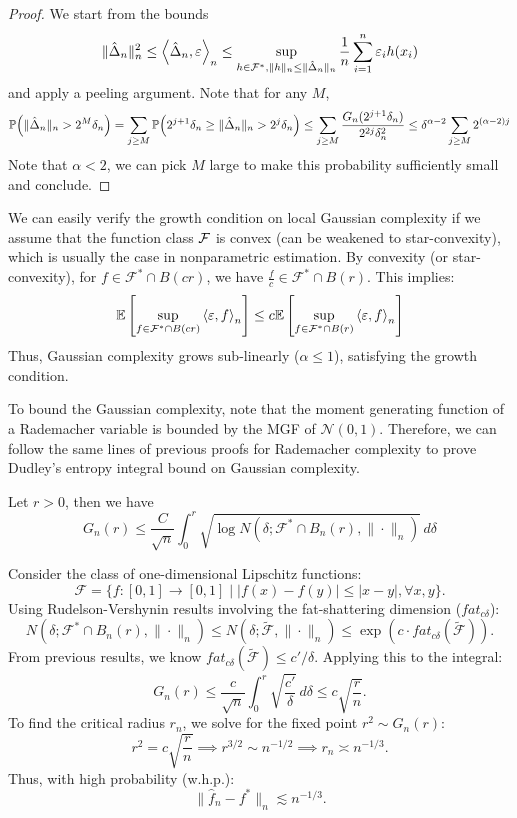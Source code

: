 \begin{proof}
We start from the bounds
$$ 
\|\hat{\Delta}_n\|_n^2\le \left\langle \hat{\Delta}_n, \varepsilon \right\rangle_n \leq \sup_{h \in \mathcal{F}^*, \|h\|_n \leq \|\hat{\Delta}_n\|_n} \frac{1}{n} \sum_{i=1}^n \varepsilon_i h(x_i) 
$$
and apply a peeling argument. Note that for any $M$,
\[
\pr \paren*{\|\hat{\Delta}_n\|_n>2^M\delta_n}=\sum_{j\ge M}\pr\paren*{2^{j+1}\delta_n\ge\|\hat{\Delta}_n\|_n>2^j\delta_n}\le \sum_{j\ge M} \frac{G_n(2^{j+1}\delta_n)}{2^{2j}\delta_n^2}\le \delta^{\alpha-2}\sum_{j\ge M}2^{(\alpha-2)j}
\]
Note that $\alpha<2$, we can pick $M$ large to make this probability sufficiently small and conclude.


\end{proof}
\begin{remark}
   We can easily verify the growth condition on local Gaussian complexity if we assume that the function class $\mathcal{F}$ is convex (can be weakened to star-convexity), which is usually the case in nonparametric estimation. By convexity (or star-convexity), for $f \in \mathcal{F}^* \cap B(cr)$, we have $\frac{f}{c} \in \mathcal{F}^* \cap B(r)$. This implies:
$$ \mathbb{E} \left[ \sup_{f \in \mathcal{F}^* \cap B(cr)} \left\langle \varepsilon, f \right\rangle_n \right] \leq c \mathbb{E} \left[ \sup_{f \in \mathcal{F}^* \cap B(r)} \left\langle \varepsilon, f \right\rangle_n \right] $$
Thus, Gaussian complexity grows sub-linearly ($\alpha \leq 1$), satisfying the growth condition.
\end{remark}


To bound the Gaussian complexity, note that the moment generating function of a Rademacher variable is bounded by the MGF of $\mathcal{N}(0,1)$. Therefore, we can follow the same lines of previous proofs for Rademacher complexity to prove Dudley's entropy integral bound on Gaussian complexity.

\begin{thm} Let $r>0$, then we have
$$ G_n(r) \leq \frac{C}{\sqrt{n}} \int_0^r \sqrt{\log N(\delta; \mathcal{F}^* \cap B_n(r), \|\cdot\|_n)} \, d\delta $$
\end{thm}

\begin{eg}
    Consider the class of one-dimensional Lipschitz functions:
\[
\mathcal{F} = \{ f: [0,1] \to [0,1] \mid |f(x) - f(y)| \leq |x-y|, \forall x,y \}.
\]
Using Rudelson-Vershynin results involving the fat-shattering dimension ($fat_{c\delta}$):
\[
N(\delta; \mathcal{F}^* \cap B_n(r), \|\cdot\|_n) \leq N(\delta; \tilde{\mathcal{F}}, \|\cdot\|_n) \leq \exp\left( c \cdot fat_{c\delta}(\tilde{\mathcal{F}}) \right).
\]
From previous results, we know $fat_{c\delta}(\tilde{\mathcal{F}}) \leq c'/\delta$. Applying this to the integral:
\[
G_n(r) \leq \frac{c}{\sqrt{n}} \int_0^r \sqrt{\frac{c'}{\delta}} \, d\delta \leq c \sqrt{\frac{r}{n}}.
\]
To find the critical radius $r_n$, we solve for the fixed point $r^2 \sim G_n(r)$:
\[
r^2 = c \sqrt{\frac{r}{n}} \implies r^{3/2} \sim n^{-1/2} \implies r_n \asymp n^{-1/3}.
\]
Thus, with high probability (w.h.p.):
\[
\|\hat{f}_n - f^*\|_n \lesssim n^{-1/3}.
\]
\end{eg}




